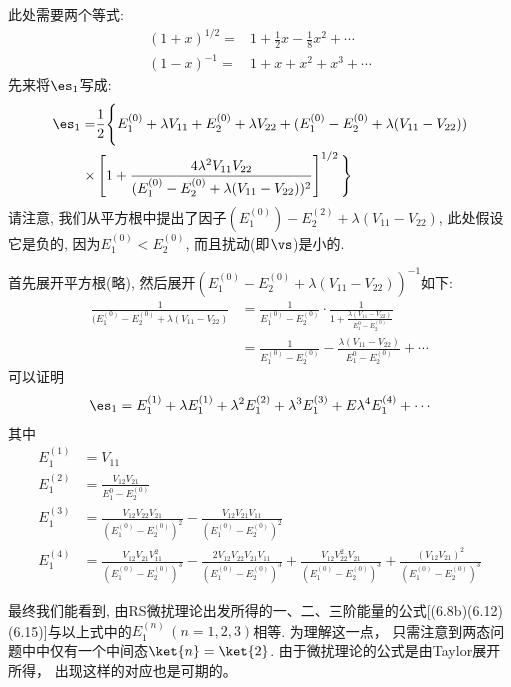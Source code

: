 此处需要两个等式:
\begin{align}
	(1+x)^{1/2} =& 1 + \frac{1}{2} x - \frac{1}{8} x^2 + \cdots\\
	(1-x)^{-1}  =& 1 +x +x^2 +x^3+\cdots
\end{align}
先来将$\es_1$写成:
\begin{align*}
\es_1 = & \frac{1}{2} \Bigg\{ E_1^{(0)} + \lambda V_{11} + E_2^{(0)} + \lambda V_{22} + (E_1^{(0)} -E_2^{(0)} +\lambda(V_{11} - V_{22}) ) \\
\times & \left[1 + \frac{4\lambda^2V_{11}V_{22}}{(E_1^{(0)}  - E_2^{(0)} + \lambda(V_{11}-V_{22}) )^2} \right]^{1/2}
     \Bigg\}
\end{align*}
请注意, 
我们从平方根中提出了因子$(E_1^{(0)}) - E_2^{(2)} +\lambda(V_{11}-V_{22}) $, 
此处假设它是负的, 
因为$E_1^{(0)}<E_2^{(0)}$, 
而且扰动(即$\vs$)是小的.


首先展开平方根(略), 
然后展开$(E_1^{(0)}-E_2^{(0)} + \lambda(V_{11}-V_{22}))^{-1}$如下:
\begin{align*}
	\frac{1}{(E_1^{(0)}-E_2^{(0)} + \lambda(V_{11}-V_{22})} & =\frac{1}{E_1^{(0)} - E_2^{(0) }}\cdot \frac{1}{1+\frac{\lambda(V_{11}-V_{22}) }{E_1^{0} -E_2^{(0)} }}\\
		& = \frac{1}{E_1^{(0)} - E_2^{(0)}} - \frac{\lambda(V_{11}-V_{22}) }{E_1^{0} -E_2^{(0)} }+\cdots
\end{align*}
可以证明
\begin{align}
\es_1 = E_1^{(1)} + \lambda E_1^{(1)} + \lambda^2 E_1^{(2)} + \lambda^3 E_1^{(3)} + E\lambda^4 E_1^{(4)} + \cdots
\end{align}
其中
\begin{subequations}
	\begin{align}
	E_1^{(1)} &= V_{11} \\
	E_1^{(2)} &= \frac{V_{12}V_{21}}{E_1^{0} - E_2^{(0)}} \\
	E_1^{(3)} &= \frac{V_{12} V_{22} V_{21} }{(E_1^{(0)} - E_2^{(0)})^2} - \frac{V_{12} V_{21} V_{11} }{ (E_1^{(0)} - E_2^{(0)})^2 }\\
	E_1^{(4)} &= \frac{V_{12} V_{21} V_{11}^2 }{(E_1^{(0)} - E_2^{(0)})^3} - \frac{2 V_{12} V_{22} V_{21} V_{11} }{(E_1^{(0)} - E_2^{(0)})^3} + \frac{V_{12} V_{22}^2 V_{21} }{(E_1^{(0)} - E_2^{(0)})^3} + \frac{ (V_{12} V_{21})^2 }{(E_1^{(0)} - E_2^{(0)})^3}
	\end{align}
\end{subequations}

最终我们能看到,
由RS微扰理论出发所得的一、二、三阶能量的公式[(6.8b)(6.12)(6.15)]与以上式中的$E_1^{(n)}\,(n=1,2,3)$相等. 
为理解这一点，
只需注意到两态问题中中仅有一个中间态$\ket{n} = \ket{2}$. 
由于微扰理论的公式是由Taylor展开所得，
出现这样的对应也是可期的。


